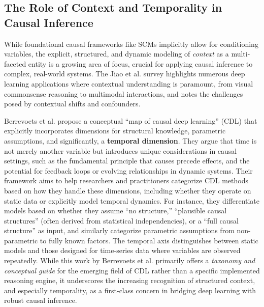 \subsection{The Role of Context and Temporality in Causal Inference}
\label{subsec:context_temporality_causality}

While foundational causal frameworks like SCMs implicitly allow for conditioning variables, the explicit, structured, and dynamic modeling of \textit{context} as a multi-faceted entity is a growing area of focus, crucial for applying causal inference to complex, real-world systems. The Jiao et al. survey \cite{jiao2024causal} highlights numerous deep learning applications where contextual understanding is paramount, from visual commonsense reasoning to multimodal interactions, and notes the challenges posed by contextual shifts and confounders.

Berrevoets et al. \cite{berrevoets2022navigatingcausaldeeplearning, berrevoets2024causaldeeplearning} propose a conceptual ``map of causal deep learning'' (CDL) that explicitly incorporates dimensions for structural knowledge, parametric assumptions, and significantly, a \textbf{temporal dimension}. They argue that time is not merely another variable but introduces unique considerations in causal settings, such as the fundamental principle that causes precede effects, and the potential for feedback loops or evolving relationships in dynamic systems. Their framework aims to help researchers and practitioners categorize CDL methods based on how they handle these dimensions, including whether they operate on static data or explicitly model temporal dynamics. For instance, they differentiate models based on whether they assume ``no structure,'' ``plausible causal structures'' (often derived from statistical independencies), or a ``full causal structure'' as input, and similarly categorize parametric assumptions from non-parametric to fully known factors. The temporal axis distinguishes between static models and those designed for time-series data where variables are observed repeatedly. While this work by Berrevoets et al. primarily offers a \textit{taxonomy and conceptual guide} for the emerging field of CDL rather than a specific implemented reasoning engine, it underscores the increasing recognition of structured context, and especially temporality, as a first-class concern in bridging deep learning with robust causal inference.

